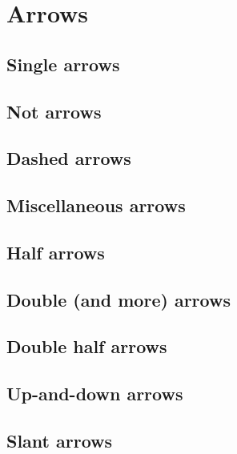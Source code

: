 \documentclass{firamath-test}
\begin{document}
\section{Arrows}

\subsection{Single arrows}

\subsection{Not arrows}

\subsection{Dashed arrows}

\subsection{Miscellaneous arrows}

\subsection{Half arrows}

\subsection{Double (and more) arrows}

\subsection{Double half arrows}

\subsection{Up-and-down arrows}

\subsection{Slant arrows}
\end{document}
